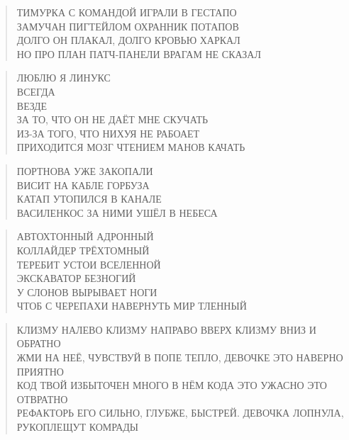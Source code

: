 \poemtitle{***}
\begin{verse}
ТИМУРКА С КОМАНДОЙ ИГРАЛИ В ГЕСТАПО\\
ЗАМУЧАН ПИГТЕЙЛОМ ОХРАННИК ПОТАПОВ\\
ДОЛГО ОН ПЛАКАЛ, ДОЛГО КРОВЬЮ ХАРКАЛ\\
НО ПРО ПЛАН ПАТЧ-ПАНЕЛИ ВРАГАМ НЕ СКАЗАЛ
\end{verse}

\poemtitle{***}
\begin{verse}
ЛЮБЛЮ Я ЛИНУКС\\
  ВСЕГДА\\
    ВЕЗДЕ\\
ЗА ТО, ЧТО ОН НЕ ДАЁТ МНЕ СКУЧАТЬ\\
  ИЗ-ЗА ТОГО, ЧТО НИХУЯ НЕ РАБОАЕТ\\
    ПРИХОДИТСЯ МОЗГ ЧТЕНИЕМ МАНОВ КАЧАТЬ
\end{verse}

\poemtitle{***}
\begin{verse}
ПОРТНОВА УЖЕ ЗАКОПАЛИ\\
ВИСИТ НА КАБЛЕ ГОРБУЗА\\
КАТАП УТОПИЛСЯ В КАНАЛЕ\\
ВАСИЛЕНКОС ЗА НИМИ УШЁЛ В НЕБЕСА
\end{verse}

\poemtitle{***}
\begin{verse}
АВТОХТОННЫЙ АДРОННЫЙ\\
КОЛЛАЙДЕР ТРЁХТОМНЫЙ\\
ТЕРЕБИТ  УСТОИ ВСЕЛЕННОЙ\\
ЭКСКАВАТОР БЕЗНОГИЙ\\
У СЛОНОВ ВЫРЫВАЕТ НОГИ\\
ЧТОБ С ЧЕРЕПАХИ НАВЕРНУТЬ МИР ТЛЕННЫЙ
\end{verse}

\poemtitle{***}
\begin{verse}
КЛИЗМУ НАЛЕВО КЛИЗМУ НАПРАВО ВВЕРХ КЛИЗМУ ВНИЗ И ОБРАТНО\\
ЖМИ НА НЕЁ, ЧУВСТВУЙ В ПОПЕ ТЕПЛО, ДЕВОЧКЕ ЭТО НАВЕРНО ПРИЯТНО\\
КОД ТВОЙ ИЗБЫТОЧЕН МНОГО В НЁМ КОДА ЭТО УЖАСНО ЭТО ОТВРАТНО\\
РЕФАКТОРЬ ЕГО СИЛЬНО, ГЛУБЖЕ, БЫСТРЕЙ. ДЕВОЧКА ЛОПНУЛА, РУКОПЛЕЩУТ КОМРАДЫ
\end{verse}

